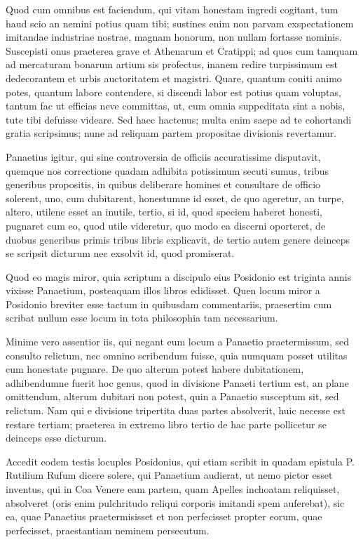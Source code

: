 Quod cum omnibus est faciendum, qui vitam honestam ingredi cogitant, tum haud scio an nemini potius quam tibi; sustines enim non parvam exspectationem imitandae industriae nostrae, magnam honorum, non nullam fortasse nominis. Suscepisti onus praeterea grave et Athenarum et Cratippi; ad quos cum tamquam ad mercaturam bonarum artium sis profectus, inanem redire turpissimum est dedecorantem et urbis auctoritatem et magistri. Quare, quantum coniti animo potes, quantum labore contendere, si discendi labor est potius quam voluptas, tantum fac ut efficias neve committas, ut, cum omnia suppeditata sint a nobis, tute tibi defuisse videare. Sed haec hactenus; multa enim saepe ad te cohortandi gratia scripsimus; nune ad reliquam partem propositae divisionis revertamur.

 Panaetius igitur, qui sine controversia de officiis accuratissime disputavit, quemque nos correctione quadam adhibita potissimum secuti sumus, tribus generibus propositis, in quibus deliberare homines et consultare de officio solerent, uno, cum dubitarent, honestumne id esset, de quo ageretur, an turpe, altero, utilene esset an inutile, tertio, si id, quod speciem haberet honesti, pugnaret cum eo, quod utile videretur, quo modo ea discerni oporteret, de duobus generibus primis tribus libris explicavit, de tertio autem genere deinceps se scripsit dicturum nec exsolvit id, quod promiserat.

 Quod eo magis miror, quia scriptum a discipulo eius Posidonio est triginta annis vixisse Panaetium, posteaquam illos libros edidisset. Quen locum miror a Posidonio breviter esse tactum in quibusdam commentariis, praesertim cum scribat nullum esse locum in tota philosophia tam necessarium.

 Minime vero assentior iis, qui negant eum locum a Panaetio praetermissum, sed consulto relictum, nec omnino scribendum fuisse, quia numquam posset utilitas cum honestate pugnare. De quo alterum potest habere dubitationem, adhibendumne fuerit hoc genus, quod in divisione Panaeti tertium est, an plane omittendum, alterum dubitari non potest, quin a Panaetio susceptum sit, sed relictum. Nam qui e divisione tripertita duas partes absolverit, huic necesse est restare tertiam; praeterea in extremo libro tertio de hac parte pollicetur se deinceps esse dicturum.

 Accedit eodem testis locuples Posidonius, qui etiam scribit in quadam epistula P. Rutilium Rufum dicere solere, qui Panaetium audierat, ut nemo pictor esset inventus, qui in Coa Venere eam partem, quam Apelles inchoatam reliquisset, absolveret (oris enim pulchritudo reliqui corporis imitandi spem auferebat), sic ea, quae Panaetius praetermisisset et non perfecisset propter eorum, quae perfecisset, praestantiam neminem persecutum.

